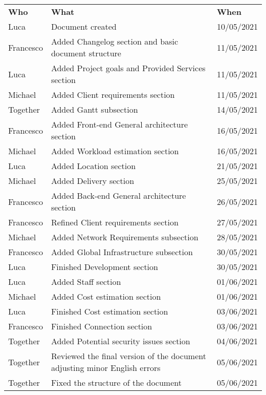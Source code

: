 \begin{longtable}{ m{2cm}m{8cm}m{3cm}} 
\centering 
 \textbf{Who}& \textbf{What} & \textbf{When}\\
Luca &			Document created			& 																	10/05/2021\\
Francesco & 	Added Changelog section and basic document structure	&										11/05/2021\\
Luca &			Added Project goals and Provided Services section&												11/05/2021\\
Michael	& 		Added Client requirements section &																11/05/2021\\
Together &      Added Gantt subsection  &																		14/05/2021\\
Francesco &		Added Front-end General architecture section  & 												16/05/2021\\
Michael &		Added Workload estimation section & 															16/05/2021\\
Luca &			Added Location section                  &														21/05/2021\\
Michael &		Added Delivery section & 																		25/05/2021\\
Francesco &		Added Back-end General architecture section& 													26/05/2021\\
Francesco & 	Refined Client requirements section &															27/05/2021\\
Michael &		Added Network Requirements subsection &															28/05/2021\\
Francesco &		Added Global Infrastructure subsection & 														30/05/2021\\
Luca &			Finished Development section & 																	30/05/2021\\
Luca & 			Added Staff section & 																			01/06/2021\\
Michael &		Added Cost estimation section &				 													01/06/2021\\
Luca &			Finished Cost estimation section & 																03/06/2021\\
Francesco &		Finished Connection section  & 																	03/06/2021\\
Together &		Added Potential security issues section &  														04/06/2021\\
Together &		Reviewed the final version of the document adjusting minor English errors &  					05/06/2021\\
Together & 		Fixed the structure of the document  &  														05/06/2021\\
\end{longtable}
\pagebreak
